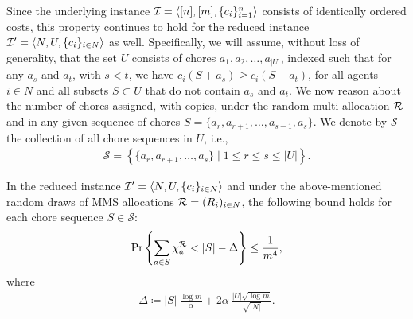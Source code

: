 Since the underlying instance $\mathcal{I} = \langle [n], [m], \{c_i\}_{i=1}^n \rangle$ consists of identically ordered costs, this property continues to hold for the reduced instance $\mathcal{I}'=\langle N,U,\{c_i\}_{i\in N}\rangle$ as well. Specifically, we will assume, without loss of generality, that the set $U$ consists of chores $a_1,a_2, \ldots, a_{|U|}$, indexed such that for any $a_s$ and $a_t$, with $s<t$, we have $c_i(S + a_s) \geq c_i(S+a_t)$, for all agents $i \in N$ and all subsets $S \subset U$ that do not contain $a_s$ and $a_t$. We now reason about the number of chores assigned, with copies, under the random multi-allocation $\mathcal{R}$ and in any given sequence of chores $S=\{a_r,a_{r+1},\ldots,a_{s-1}, a_s\}$. We denote by $\mathcal{S}$ the collection of all chore sequences in $U$, i.e., 
\begin{align*}
\mathcal{S}=\left\{ \{a_r,a_{r+1},\dots,a_s\}\mid 1\leq r\leq s\leq |U| \right\}.
\end{align*}


\begin{lemma}\label{lem:ordered-sequences}
In the reduced instance $\mathcal{I}'=\langle N,U,\{c_i\}_{i\in N}\rangle$ and under the above-mentioned random draws of MMS allocations $\mathcal{R}=(R_i)_{i\in N}$, the following bound holds for each chore sequence $S \in \mathcal{S}$: 
\begin{align*}
    \Pr \left\{\sum_{a\in S} \chi^{\mathcal{R}}_a < |S|-\Delta\right\}\leq \frac{1}{m^4},
    \end{align*}
    where 
    \begin{align*}
        \Delta \coloneqq |S|\ \frac{\log m}{\alpha} +2\alpha\ \frac{|U| \sqrt{\log m}}{\sqrt{|N|}}.
    \end{align*}
\end{lemma}

